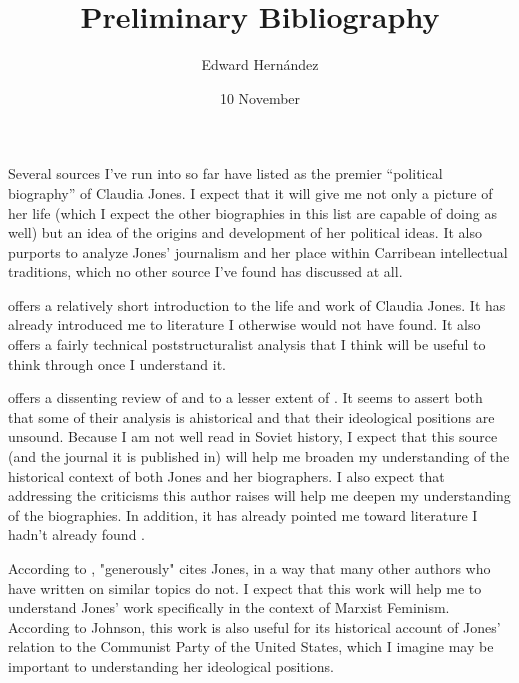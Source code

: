 \documentclass[doc,12pt]{apa6}
\begin{document}
\title{Preliminary Bibliography}
\author{Edward Hern\'{a}ndez}
\date{10 November}
\maketitle

Several sources I've run into so far have listed  as the
premier ``political biography'' of Claudia Jones. I expect that it will give me
not only a picture of her life (which I expect the other biographies in this
list are capable of doing as well) but an idea of the origins and development
of her political ideas. It also purports to analyze Jones' journalism and her
place within Carribean intellectual traditions, which no other source I've
found has discussed at all.

\vspace{15pt}

 offers a relatively short introduction to the life and work
of Claudia Jones. It has already introduced me to literature I otherwise would
not have found. It also offers a fairly technical poststructuralist analysis
that I think will be useful to think through once I understand it.

\vspace{15pt}

 offers a dissenting review of  and to a
lesser extent of . It seems to assert both that some of their
analysis is ahistorical and that their ideological positions are unsound.
Because I am not well read in Soviet history, I expect that this source (and
the journal it is published in) will help me broaden my understanding of the
historical context of both Jones and her biographers. I also expect that
addressing the criticisms this author raises will help me deepen my
understanding of the biographies. In addition, it has already pointed me toward
literature I hadn't already found \cite{Sherwood00}.

\vspace{15pt}

According to \cite{Johnson08},  "generously" cites Jones, in a
way that many other authors who have written on similar topics do not. I expect
that this work will help me to understand Jones' work specifically in the
context of Marxist Feminism. According to Johnson, this work is also useful for
its historical account of Jones' relation to the Communist Party of the United
States, which I imagine may be important to understanding her ideological
positions.

\nocite{Davies08,Davies11,Howard13,Johnson08,Johnson84,Jones49a,Jones49b,McDuffie11,OBrien14,Olende14,Sherwood00,Washington03,Weigand01}

\clearpage


\end{document}
